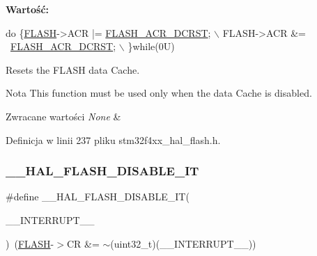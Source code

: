 {\bfseries Wartość\+:}
\begin{DoxyCode}
\textcolor{keywordflow}{do} \{\hyperlink{group___peripheral__declaration_ga844ea28ba1e0a5a0e497f16b61ea306b}{FLASH}->ACR |= \hyperlink{group___peripheral___registers___bits___definition_gac53d7c85551a9829014d6027d67ce6c7}{FLASH\_ACR\_DCRST};  \(\backslash\)
                                           FLASH->ACR &= ~\hyperlink{group___peripheral___registers___bits___definition_gac53d7c85551a9829014d6027d67ce6c7}{FLASH\_ACR\_DCRST}; \(\backslash\)
                                          \}\textcolor{keywordflow}{while}(0U)
\end{DoxyCode}


Resets the F\+L\+A\+SH data Cache. 

\begin{DoxyNote}{Nota}
This function must be used only when the data Cache is disabled. 
\end{DoxyNote}

\begin{DoxyRetVals}{Zwracane wartości}
{\em None} & \\
\hline
\end{DoxyRetVals}


Definicja w linii 237 pliku stm32f4xx\+\_\+hal\+\_\+flash.\+h.

\mbox{\label{group___f_l_a_s_h___exported___macros_ga1f40f507b5d4b3a4da68e4244a1097ee}} 
\subsubsection{\texorpdfstring{\+\_\+\+\_\+\+H\+A\+L\+\_\+\+F\+L\+A\+S\+H\+\_\+\+D\+I\+S\+A\+B\+L\+E\+\_\+\+IT}{\_\_HAL\_FLASH\_DISABLE\_IT}}
{\footnotesize\ttfamily \#define \+\_\+\+\_\+\+H\+A\+L\+\_\+\+F\+L\+A\+S\+H\+\_\+\+D\+I\+S\+A\+B\+L\+E\+\_\+\+IT(\begin{DoxyParamCaption}\item[{}]{\+\_\+\+\_\+\+I\+N\+T\+E\+R\+R\+U\+P\+T\+\_\+\+\_\+ }\end{DoxyParamCaption})~(\hyperlink{group___peripheral__declaration_ga844ea28ba1e0a5a0e497f16b61ea306b}{F\+L\+A\+SH}-\/$>$CR \&= $\sim$(uint32\+\_\+t)(\+\_\+\+\_\+\+I\+N\+T\+E\+R\+R\+U\+P\+T\+\_\+\+\_\+))}



